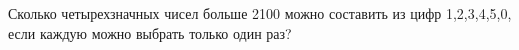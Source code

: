 \question
Сколько четырехзначных чисел больше 2100 можно составить из цифр 1,2,3,4,5,0, если каждую можно выбрать только один раз?
